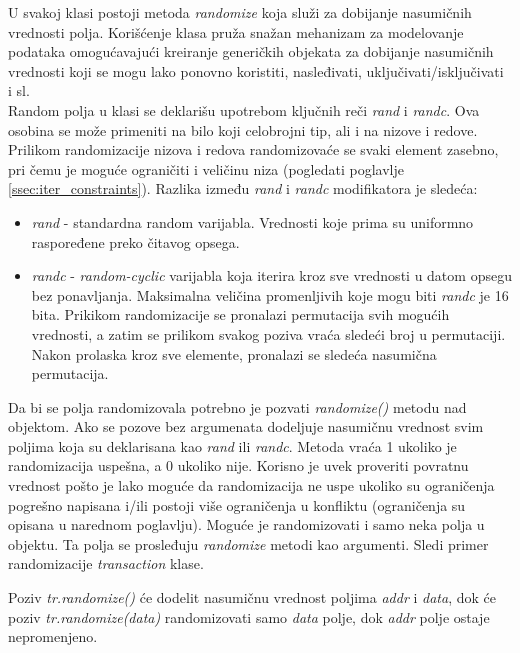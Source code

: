 U svakoj klasi postoji metoda \emph{randomize} koja služi za dobijanje
nasumičnih vrednosti polja.
Korišćenje klasa pruža snažan mehanizam za modelovanje podataka omogućavajući
kreiranje generičkih objekata za dobijanje nasumičnih vrednosti koji se mogu
lako ponovno koristiti, nasleđivati, uključivati/isključivati i sl.\\

Random polja u klasi se deklarišu upotrebom ključnih reči \emph{rand} i \emph{randc}. 
Ova osobina se može primeniti na bilo koji celobrojni tip, ali i na nizove i
redove.
Prilikom randomizacije nizova i redova randomizovaće se svaki element zasebno,
pri čemu je moguće ograničiti i veličinu niza (pogledati poglavlje
\ref{ssec:iter_constraints}).
Razlika između \emph{rand} i \emph{randc} modifikatora je sledeća:
\begin{itemize}
\item \emph{rand} - standardna random varijabla. Vrednosti koje prima su
  uniformno raspoređene preko čitavog opsega.
\item \emph{randc} - \emph{random-cyclic} varijabla koja iterira kroz sve
  vrednosti u datom opsegu bez ponavljanja. Maksimalna veličina promenljivih
  koje mogu biti \emph{randc} je 16 bita. Prikikom randomizacije se pronalazi
  permutacija svih mogućih vrednosti, a zatim se prilikom svakog poziva vraća
  sledeći broj u permutaciji. Nakon prolaska kroz sve elemente, pronalazi se
  sledeća nasumična permutacija.
\end{itemize}

Da bi se polja randomizovala potrebno je pozvati \emph{randomize()} metodu nad
objektom. Ako se pozove bez argumenata dodeljuje nasumičnu vrednost svim poljima
koja su deklarisana kao \emph{rand} ili \emph{randc}. Metoda vraća 1 ukoliko je
randomizacija uspešna, a 0 ukoliko nije. Korisno je uvek proveriti povratnu
vrednost pošto je lako moguće da randomizacija ne uspe ukoliko su ograničenja
pogrešno napisana i/ili postoji više ograničenja u konfliktu (ograničenja su
opisana u narednom poglavlju). Moguće je randomizovati i samo neka polja u
objektu. Ta polja se prosleđuju \emph{randomize} metodi kao argumenti. Sledi
primer randomizacije \emph{transaction} klase.



Poziv \emph{tr.randomize()} će dodelit nasumičnu vrednost poljima \emph{addr} i
\emph{data}, dok će poziv \emph{tr.randomize(data)} randomizovati samo
\emph{data} polje, dok \emph{addr} polje ostaje nepromenjeno.\\

